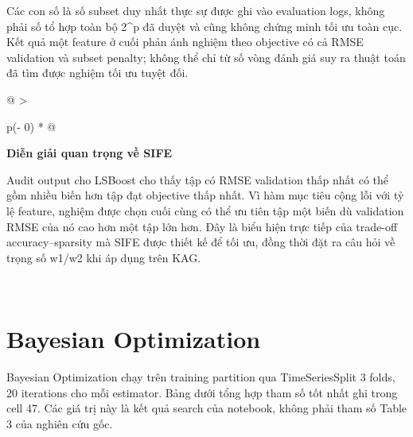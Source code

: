 Các con số là số subset duy nhất thực sự được ghi vào evaluation logs, không phải số tổ hợp toàn bộ 2\^{}p đã duyệt và cũng không chứng minh tối ưu toàn cục. Kết quả một feature ở cuối phản ánh nghiệm theo objective có cả RMSE validation và subset penalty; không thể chỉ từ số vòng đánh giá suy ra thuật toán đã tìm được nghiệm tối ưu tuyệt đối.

\begin{longtable}[]{@{}
  >{\raggedright\arraybackslash}p{(\columnwidth - 0\tabcolsep) * }@{}}
\toprule\noalign{}
\begin{minipage}[b]{\linewidth}\raggedright
\textbf{Diễn giải quan trọng về SIFE}

Audit output cho LSBoost cho thấy tập có RMSE validation thấp nhất có thể gồm nhiều biến hơn tập đạt objective thấp nhất. Vì hàm mục tiêu cộng lỗi với tỷ lệ feature, nghiệm được chọn cuối cùng có thể ưu tiên tập một biến dù validation RMSE của nó cao hơn một tập lớn hơn. Đây là biểu hiện trực tiếp của trade-off accuracy--sparsity mà SIFE được thiết kế để tối ưu, đồng thời đặt ra câu hỏi về trọng số w1/w2 khi áp dụng trên KAG.
\end{minipage} \\
\midrule\noalign{}
\endhead
\bottomrule\noalign{}
\endlastfoot
\end{longtable}

\section{Bayesian Optimization}\label{bayesian-optimization-1}

Bayesian Optimization chạy trên training partition qua TimeSeriesSplit 3 folds, 20 iterations cho mỗi estimator. Bảng dưới tổng hợp tham số tốt nhất ghi trong cell 47. Các giá trị này là kết quả search của notebook, không phải tham số Table 3 của nghiên cứu gốc.

